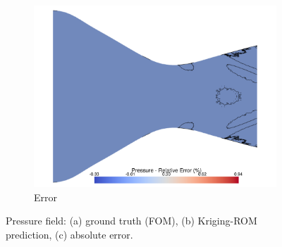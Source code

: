 \documentclass[tg, EN]{ufabcFHZh_tg}
\begin{document}
\begin{figure}[H]
\begin{subfigure}[b]{0.32\textwidth}
        \includegraphics[width=\textwidth]{Figuras/kriging_error_pressure.pdf}
        \caption{Error}
    \end{subfigure}
    \caption{Pressure field: (a) ground truth (FOM), (b) Kriging-ROM prediction, (c) absolute error.}
    \label{fig:kriging_reconstruction_pressure}
\end{figure}
\end{document}
